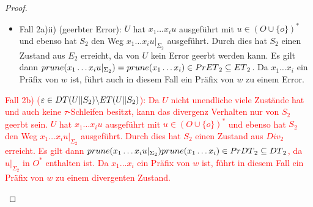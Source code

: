 \begin{proof}
\begin{itemize}
\begin{itemize}
\begin{itemize}
              $q_{02} \overset{x_1\dots x_i}{\Rightarrow} q'
              \overset{x_{i+1}}{\not{\hspace{-0.1cm}\rightarrow}}$ und damit
              gilt $x_1\dots x_{i+1}\in \MIT{}_2\subseteq \ET{}_2$. Somit ist
              ein Präfix von $w$ in $\ET{}_2$ enthalten.
            \item Fall 2a)ii) (geerbter Error): $U$ hat $x_1\dots x_iu$
              ausgeführt mit $u\in (O\cup\{o\})^*$ und ebenso hat $S_2$ den
              Weg $x_1\dots x_iu|_{\Sigma _2}$ ausgeführt. Durch dies hat $S_2$ einen
              Zustand aus $E_2$ erreicht, da von $U$ kein Error geerbt werden
              kann. Es gilt dann $prune{}(x_1\dots x_iu|_{\Sigma _2})=
              prune{}(x_1\dots x_i)\in PrET{}_2\subseteq ET{}_2$. Da
              $x_1\dots x_i$ ein Präfix von $w$ ist, führt auch in diesem Fall
              ein Präfix von $w$ zu einem Error.
          \end{itemize}
        \textcolor{red}{\item Fall 2b) ($\varepsilon\in DT{}(U\|S_2)\backslash ET{}(U\|S_2)$):
          Da $U$ nicht unendliche viele Zustände hat und auch keine
          $\tau$-Schleifen besitzt, kann das divergenz Verhalten nur von $S_2$
          geerbt sein. $U$ hat $x_1\dots x_iu$ ausgeführt mit $u\in (O\cup
          \{o\})^*$ und ebenso hat $S_2$ den Weg $x_1\dots x_iu|_{\Sigma _2}$
          ausgeführt. Durch dies hat $S_2$ einen Zustand aus $Div_2$
          erreicht. Es gilt dann $prune{}(x_1\dots x_iu|_{\Sigma
          _2})prune{}(x_1\dots x_i)\in PrDT{}_2\subseteq DT{}_2$, da
          $u|_{\Sigma _2}$ in $O^*$ enthalten ist. Da $x_1\dots x_i$ ein Präfix
          von $w$ ist, führt in diesem Fall ein Präfix von $w$ zu einem
        divergenten Zustand.}
      \end{itemize}
  \end{itemize}


\end{proof}
